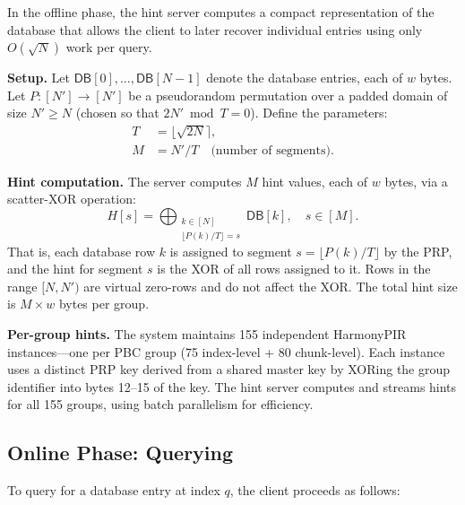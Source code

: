 In the offline phase, the hint server computes a compact representation of the database that allows the client to later recover individual entries using only $O(\sqrt{N})$ work per query.

\textbf{Setup.} Let $\mathsf{DB}[0], \ldots, \mathsf{DB}[N{-}1]$ denote the database entries, each of $w$ bytes. Let $P: [N'] \to [N']$ be a pseudorandom permutation over a padded domain of size $N' \geq N$ (chosen so that $2N' \bmod T = 0$). Define the parameters:
\begin{align*}
    T &= \lfloor\sqrt{2N}\rceil, \\
    M &= N'/T \quad \text{(number of segments)}.
\end{align*}

\textbf{Hint computation.} The server computes $M$ hint values, each of $w$ bytes, via a scatter-XOR operation:
$$H[s] = \bigoplus_{\substack{k \in [N] \\ \lfloor P(k)/T \rfloor = s}} \mathsf{DB}[k], \quad s \in [M].$$
That is, each database row $k$ is assigned to segment $s = \lfloor P(k)/T \rfloor$ by the PRP, and the hint for segment $s$ is the XOR of all rows assigned to it. Rows in the range $[N, N')$ are virtual zero-rows and do not affect the XOR. The total hint size is $M \times w$ bytes per group.

\textbf{Per-group hints.} The system maintains 155 independent HarmonyPIR instances---one per PBC group (75 index-level + 80 chunk-level). Each instance uses a distinct PRP key derived from a shared master key by XORing the group identifier into bytes 12--15 of the key. The hint server computes and streams hints for all 155 groups, using batch parallelism for efficiency.

\subsection{Online Phase: Querying}
\label{sec:harmony-online}

To query for a database entry at index $q$, the client proceeds as follows:

